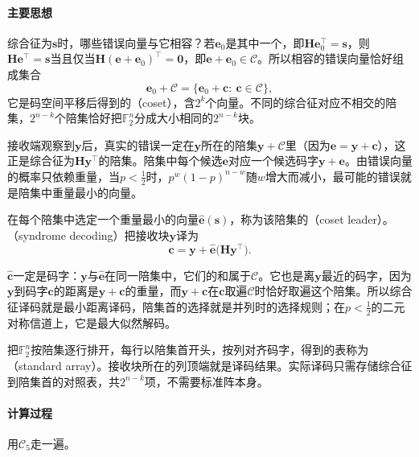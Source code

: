\paragraph{主要思想}
综合征为$\bm{s}$时，哪些错误向量与它相容？若$\bm{e}_0$是其中一个，即$\bm{H}\bm{e}_0^{\top}=\bm{s}$，则$\bm{H}\bm{e}^{\top}=\bm{s}$当且仅当$\bm{H}(\bm{e}+\bm{e}_0)^{\top}=\bm{0}$，即$\bm{e}+\bm{e}_0\in\mathcal{C}$。所以相容的错误向量恰好组成集合
\begin{equation}
 \bm{e}_0+\mathcal{C}=\{\bm{e}_0+\bm{c}:\ \bm{c}\in\mathcal{C}\},
 \label{eq:ccode-coset}
\end{equation}
它是码空间平移后得到的（coset），含$2^{k}$个向量。不同的综合征对应不相交的陪集，$2^{n-k}$个陪集恰好把$\mathbb{F}_2^{n}$分成大小相同的$2^{n-k}$块。

接收端观察到$\bm{y}$后，真实的错误一定在$\bm{y}$所在的陪集$\bm{y}+\mathcal{C}$里（因为$\bm{e}=\bm{y}+\bm{c}$），这正是综合征为$\bm{H}\bm{y}^{\top}$的陪集。陪集中每个候选$\bm{e}$对应一个候选码字$\bm{y}+\bm{e}$。由错误向量的概率只依赖重量，当$p<\tfrac12$时，$p^{w}(1-p)^{n-w}$随$w$增大而减小，最可能的错误就是陪集中重量最小的向量。

\begin{definition}[陪集首与综合征译码]
\label{def:ccode-syndrome-decoding}
在每个陪集中选定一个重量最小的向量$\hat{\bm{e}}(\bm{s})$，称为该陪集的（coset leader）。（syndrome decoding）把接收块$\bm{y}$译为
\begin{equation}
 \hat{\bm{c}}=\bm{y}+\hat{\bm{e}}\bigl(\bm{H}\bm{y}^{\top}\bigr) .
 \label{eq:ccode-syndrome-decode}
\end{equation}
\end{definition}

$\hat{\bm{c}}$一定是码字：$\bm{y}$与$\hat{\bm{e}}$在同一陪集中，它们的和属于$\mathcal{C}$。它也是离$\bm{y}$最近的码字，因为$\bm{y}$到码字$\bm{c}$的距离是$\bm{y}+\bm{c}$的重量，而$\bm{y}+\bm{c}$在$\bm{c}$取遍$\mathcal{C}$时恰好取遍这个陪集。所以综合征译码就是最小距离译码，陪集首的选择就是并列时的选择规则；在$p<\tfrac12$的二元对称信道上，它是最大似然解码。

把$\mathbb{F}_2^{n}$按陪集逐行排开，每行以陪集首开头，按列对齐码字，得到的表称为（standard array）。接收块所在的列顶端就是译码结果。实际译码只需存储综合征到陪集首的对照表，共$2^{n-k}$项，不需要标准阵本身。

\paragraph{计算过程}
用$\mathcal{C}_5$走一遍。

